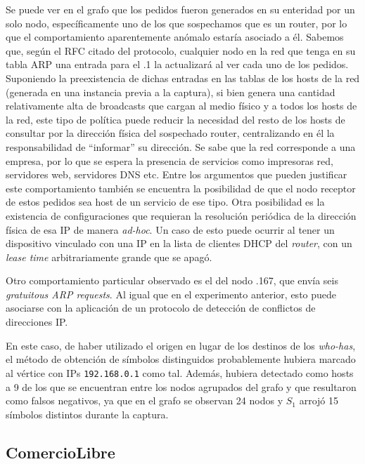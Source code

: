 Se puede ver en el grafo que los pedidos fueron generados en su enteridad por un solo nodo, específicamente uno de los que sospechamos que es un router, por lo que el comportamiento aparentemente anómalo estaría asociado a él. Sabemos que, según el RFC citado del protocolo, cualquier nodo en la red que tenga en su tabla ARP una entrada para el .1 la actualizará al ver cada uno de los pedidos. Suponiendo la preexistencia de dichas entradas en las tablas de los hosts de la red (generada en una instancia previa a la captura), si bien genera una cantidad relativamente alta de broadcasts que cargan al medio físico y a todos los hosts de la red, este tipo de política puede reducir la necesidad del resto de los hosts de consultar por la dirección física del sospechado router, centralizando en él la responsabilidad de ``informar'' su dirección. Se sabe que la red corresponde a una empresa, por lo que se espera la presencia de servicios como impresoras red, servidores web, servidores DNS etc. Entre los argumentos que pueden justificar este comportamiento también se encuentra la posibilidad de que el nodo receptor de estos pedidos sea host de un servicio de ese tipo. Otra posibilidad es la existencia de configuraciones que requieran la resolución periódica de la dirección física de esa IP de manera \textit{ad-hoc}. Un caso de esto puede ocurrir al tener un dispositivo vinculado con una IP en la lista de clientes DHCP del \textit{router}, con un \textit{lease time} arbitrariamente grande que se apagó.

Otro comportamiento particular observado es el del nodo .167, que envía seis \textit{gratuitous ARP requests}. Al igual que en el experimento anterior, esto puede asociarse con la aplicación de un protocolo de detección de conflictos de direcciones IP.

En este caso, de haber utilizado el origen en lugar de los destinos de los \textit{who-has}, el método de obtención de símbolos distinguidos probablemente hubiera marcado al vértice con IPs \texttt{192.168.0.1} como tal. Además, hubiera detectado como hosts a 9 de los que se encuentran entre los nodos agrupados del grafo y que resultaron como falsos negativos, ya que en el grafo se observan 24 nodos y $S_1$ arrojó 15 símbolos distintos durante la captura.


\subsection{\textbf{ComercioLibre}}

